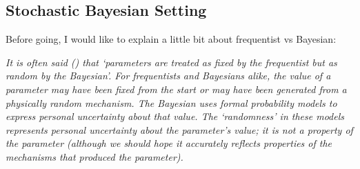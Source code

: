 \documentclass{article}
\begin{document}
\subsection{Stochastic Bayesian Setting}
Before going, I would like to explain a little bit about frequentist vs Bayesian:

\emph{It is often said () that ‘parameters are treated as fixed by the frequentist but as random by the Bayesian’. For frequentists and Bayesians alike, the value of a parameter may have been fixed from the start or may have been generated from a physically random mechanism.  The Bayesian uses formal probability models to express personal uncertainty about that value. The ‘randomness’ in these models represents personal uncertainty about the parameter’s value; it is not a property of the parameter (although we should hope it accurately reflects properties of the mechanisms that produced the parameter).}
\end{document}
